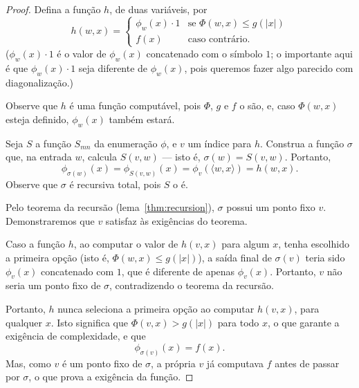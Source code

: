\begin{proof}
    Defina a função $h$, de duas variáveis, por
    \begin{equation*}
        h(w, x) = \begin{cases}
            \phi_w(x) \cdot 1 & \text{se $\Phi(w, x) \leq g(|x|)$} \\
            f(x) & \text{caso contrário.}
        \end{cases}
    \end{equation*}
    ($\phi_w(x) \cdot 1$ é o valor de $\phi_w(x)$ concatenado com o símbolo $1$;
    o importante aqui é que $\phi_w(x) \cdot 1$ seja diferente de $\phi_w(x)$,
    pois queremos fazer algo parecido com diagonalização.)

    Observe que $h$ é uma função computável,
    pois $\Phi$, $g$ e $f$ o são,
    e, caso $\Phi(w, x)$ esteja definido,
    $\phi_w(x)$ também estará.

    Seja $S$ a função $S_{mn}$ da enumeração $\phi$,
    e $v$ um índice para $h$.
    Construa a função $\sigma$ que,
    na entrada $w$, calcula $S(v, w)$
    --- isto é, $\sigma(w) = S(v, w)$.
    Portanto,
    \begin{equation*}
        \phi_{\sigma(w)}(x) = \phi_{S(v, w)}(x) = \phi_v(\langle w, x \rangle) = h(w, x).
    \end{equation*}
    Observe que $\sigma$ é recursiva total, pois $S$ o é.

    Pelo teorema da recursão (lema~\ref{thm:recursion}),
    $\sigma$ possui um ponto fixo $v$.
    Demonstraremos que $v$ satisfaz às exigências do teorema.

    Caso a função $h$, ao computar o valor de $h(v, x)$
    para algum $x$,
    tenha escolhido a primeira opção
    (isto é, $\Phi(w, x) \leq g(|x|)$),
    a saída final de $\sigma(v)$ teria sido
    $\phi_{v} (x)$ concatenado com $1$,
    que é diferente de apenas $\phi_{v}(x)$.
    Portanto, $v$ não seria um ponto fixo de $\sigma$,
    contradizendo o teorema da recursão.

    Portanto, $h$ nunca seleciona a primeira opção
    ao computar $h(v, x)$, para qualquer $x$.
    Isto significa que $\Phi(v, x) > g(|x|)$ para todo $x$,
    o que garante a exigência de complexidade,
    e que
    \begin{equation*}
        \phi_{\sigma(v)}(x) = f(x).
    \end{equation*}
    Mas, como $v$ é um ponto fixo de $\sigma$,
    a própria $v$ já computava $f$ antes de passar por $\sigma$,
    o que prova a exigência da função.
\end{proof}
